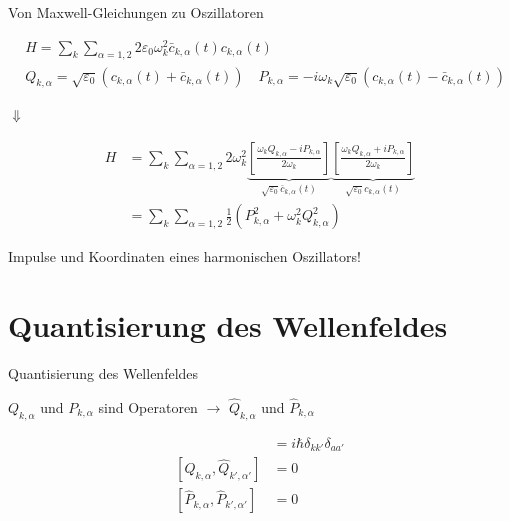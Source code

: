 \documentclass{beamer}
\begin{document}
\begin{frame}[t]{Von Maxwell-Gleichungen zu Oszillatoren}
	\vspace*{-0.5cm}
	\begin{center}
		\begin{minipage}{0.35\textwidth}
			\begin{align*}
			& H = \sum_k \sum_{\alpha=1,2} 2 \varepsilon_0 \omega_k^2 \bar{c}_{k,\alpha}(t) c_{k,\alpha}(t) \\
			& Q_{k,\alpha} = \sqrt{\varepsilon_0} \left(c_{k,\alpha}(t) + \bar{c}_{k,\alpha}(t)\right) \quad P_{k,\alpha} = -i \omega_k \sqrt{\varepsilon_0} \left(c_{k,\alpha}(t) - \bar{c}_{k,\alpha}(t)\right) 
			\end{align*}
		\end{minipage}
		
		\vspace*{0.5cm}
		$\Downarrow$
		
		\begin{minipage}{0.35\textwidth}
			\begin{align*}
			H &= \sum_k \sum_{\alpha=1,2} 2 \omega_k^2 
			\underbrace{\left[ \frac{\omega_k Q_{k,\alpha} - i P_{k,\alpha}}{2 \omega_k} \right]}_{\sqrt{\varepsilon_0} \bar{c}_{k,\alpha}(t)}
			\underbrace{\left[ \frac{\omega_k Q_{k,\alpha} + i P_{k,\alpha}}{2 \omega_k} \right]}_{\sqrt{\varepsilon_0} c_{k,\alpha}(t)} \\
			&= \sum_k \sum_{\alpha=1,2} \frac{1}{2} \left(P_{k,\alpha}^2 + \omega_k^2 Q_{k,\alpha}^2\right)
			\end{align*}
		\end{minipage}
		
		Impulse und Koordinaten eines harmonischen Oszillators!
	\end{center}
\end{frame}


\section{Quantisierung des Wellenfeldes}
\begin{frame}[t]{Quantisierung des Wellenfeldes}
	\vspace*{-0.5cm}
	\begin{center}
		$Q_{k,\alpha}$ und $P_{k,\alpha}$ sind Operatoren $\rightarrow$ $\hat{Q}_{k,\alpha}$ und $\hat{P}_{k,\alpha}$
		
		\begin{minipage}{0.35\textwidth}
			\begin{align*}
			[\hat{Q}_{k,\alpha}, \hat{P}_{k',\alpha'}] &= i \hbar \delta_{kk'}\delta_{aa'} \\
			[\hat{Q}_{k,\alpha}, \hat{Q}_{k',\alpha'}] &= 0 \\
			[\hat{P}_{k,\alpha}, \hat{P}_{k',\alpha'}] &= 0
			\end{align*}
		\end{minipage}
	\end{center}
\end{frame}
\end{document}
